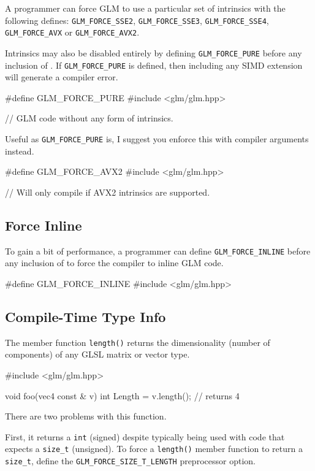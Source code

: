 \documentclass{scrartcl}
\numberwithin{figure}{subsection}
\begin{document}
A programmer can force GLM to use a particular set of intrinsics with the following defines: \verb|GLM_FORCE_SSE2|, \verb|GLM_FORCE_SSE3|, \verb|GLM_FORCE_SSE4|, \verb|GLM_FORCE_AVX| or \verb|GLM_FORCE_AVX2|.

Intrinsics may also be disabled entirely by defining \verb|GLM_FORCE_PURE| before any inclusion of . If \verb|GLM_FORCE_PURE| is defined, then including any SIMD extension will generate a compiler error.

\begin{cppcode}
#define GLM_FORCE_PURE
#include <glm/glm.hpp>

// GLM code without any form of intrinsics.
\end{cppcode}

Useful as \verb|GLM_FORCE_PURE| is, I suggest you enforce this with compiler arguments instead.

\begin{cppcode}
#define GLM_FORCE_AVX2
#include <glm/glm.hpp>

// Will only compile if AVX2 intrinsics are supported.
\end{cppcode}

\subsection{Force Inline}
To gain a bit of performance, a programmer can define \verb|GLM_FORCE_INLINE| before any inclusion of  to force the compiler to inline GLM code.

\begin{cppcode}
#define GLM_FORCE_INLINE 
#include <glm/glm.hpp>
\end{cppcode}

\subsection{Compile-Time Type Info}
The member function \verb|length()| returns the dimensionality (number of components) of any GLSL matrix or vector type.

\begin{cppcode}
#include <glm/glm.hpp>

void foo(vec4 const & v)
{
  int Length = v.length();  // returns 4
}
\end{cppcode}

There are two problems with this function.

First, it returns a \verb|int| (signed) despite typically being used with code that expects a \verb|size_t| (unsigned). To force a \verb|length()| member function to return a \verb|size_t|, define the \verb|GLM_FORCE_SIZE_T_LENGTH| preprocessor option.
\end{document}
